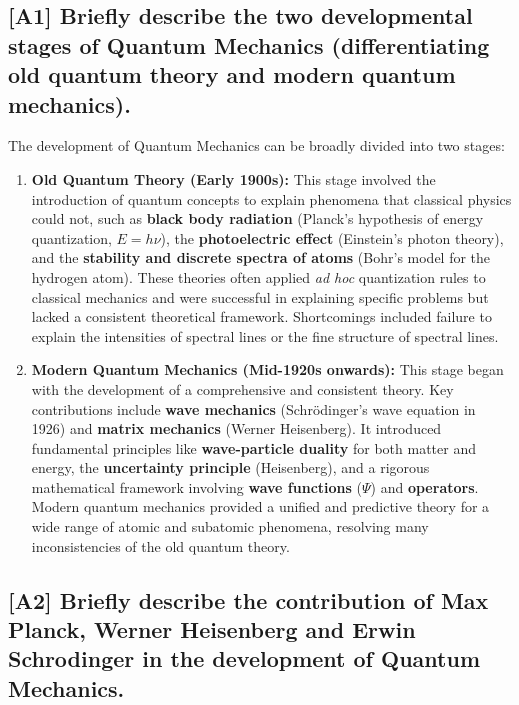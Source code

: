 \documentclass[12pt]{article}
\begin{document}
\subsection{[A1] Briefly describe the two developmental stages of Quantum Mechanics (differentiating old quantum theory and modern quantum mechanics).}

The development of Quantum Mechanics can be broadly divided into two stages:
\begin{enumerate}
    \item \textbf{Old Quantum Theory (Early 1900s):} This stage involved the introduction of quantum concepts to explain phenomena that classical physics could not, such as \textbf{black body radiation} (Planck's hypothesis of energy quantization, $E=h\nu$), the \textbf{photoelectric effect} (Einstein's photon theory), and the \textbf{stability and discrete spectra of atoms} (Bohr's model for the hydrogen atom). These theories often applied \textit{ad hoc} quantization rules to classical mechanics and were successful in explaining specific problems but lacked a consistent theoretical framework. Shortcomings included failure to explain the intensities of spectral lines or the fine structure of spectral lines.

    \item \textbf{Modern Quantum Mechanics (Mid-1920s onwards):} This stage began with the development of a comprehensive and consistent theory. Key contributions include \textbf{wave mechanics} (Schrödinger's wave equation in 1926) and \textbf{matrix mechanics} (Werner Heisenberg). It introduced fundamental principles like \textbf{wave-particle duality} for both matter and energy, the \textbf{uncertainty principle} (Heisenberg), and a rigorous mathematical framework involving \textbf{wave functions} ($\Psi$) and \textbf{operators}. Modern quantum mechanics provided a unified and predictive theory for a wide range of atomic and subatomic phenomena, resolving many inconsistencies of the old quantum theory.
\end{enumerate}

\subsection{[A2] Briefly describe the contribution of Max Planck, Werner Heisenberg and Erwin Schrodinger in the development of Quantum Mechanics.}
\end{document}
